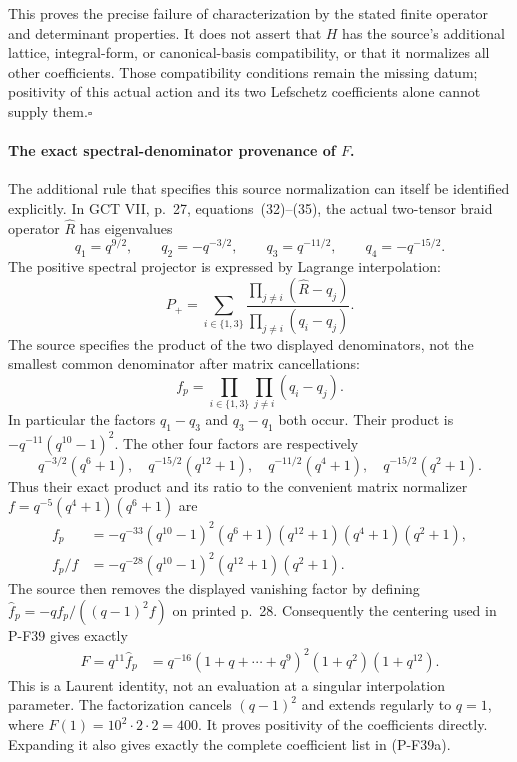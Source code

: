 This proves the precise failure of characterization by the stated
finite operator and determinant properties. It does not assert
that $H$ has the source's additional lattice, integral-form, or
canonical-basis compatibility, or that it normalizes all other
coefficients. Those compatibility conditions remain the missing
datum; positivity of this actual action and its two Lefschetz
coefficients alone cannot supply them.\hfill$\square$

\paragraph{The exact spectral-denominator provenance of $F$.}
The additional rule that specifies this source normalization can
itself be identified explicitly. In GCT VII, p.~27,
equations~(32)--(35), the actual two-tensor braid operator
$\widehat R$ has eigenvalues
\[
       q_1=q^{9/2},\qquad q_2=-q^{-3/2},\qquad
       q_3=q^{-11/2},\qquad q_4=-q^{-15/2}.                    \tag{P-F52q}
\]
The positive spectral projector is expressed by Lagrange interpolation:
\[
  P_+=\sum_{i\in\{1,3\}}
       \frac{\prod_{j\ne i}(\widehat R-q_j)}
            {\prod_{j\ne i}(q_i-q_j)}.
\]
The source specifies the product of the two displayed denominators,
not the smallest common denominator after matrix cancellations:
\[
 f_p=\prod_{i\in\{1,3\}}\prod_{j\ne i}(q_i-q_j).
                                                               \tag{P-F52r}
\]
In particular the factors $q_1-q_3$ and $q_3-q_1$ both occur.
Their product is $-q^{-11}(q^{10}-1)^2$. The other four factors
are respectively
\[
 q^{-3/2}(q^6+1),\quad q^{-15/2}(q^{12}+1),\quad
 q^{-11/2}(q^4+1),\quad q^{-15/2}(q^2+1).
\]
Thus their exact product and its ratio to the convenient matrix
normalizer $f=q^{-5}(q^4+1)(q^6+1)$ are
\[
 \begin{split}
 f_p&=-q^{-33}(q^{10}-1)^2(q^6+1)(q^{12}+1)(q^4+1)(q^2+1),\\
 f_p/f&=-q^{-28}(q^{10}-1)^2(q^{12}+1)(q^2+1).
 \end{split}
\]
The source then removes the displayed vanishing factor by defining
$\widehat f_p=-q f_p/((q-1)^2f)$ on printed p.~28.
Consequently the centering used in P-F39 gives exactly
\[
 \begin{split}
 F=q^{11}\widehat f_p
  &=q^{-16}(1+q+\cdots+q^9)^2(1+q^2)(1+q^{12}).
 \end{split}                                                    \tag{P-F52s}
\]
This is a Laurent identity, not an evaluation at a singular
interpolation parameter. The factorization cancels $(q-1)^2$
and extends regularly to $q=1$, where $F(1)=10^2\cdot2\cdot2=400$.
It proves positivity of the coefficients directly. Expanding it
also gives exactly the complete coefficient list in (P-F39a).

